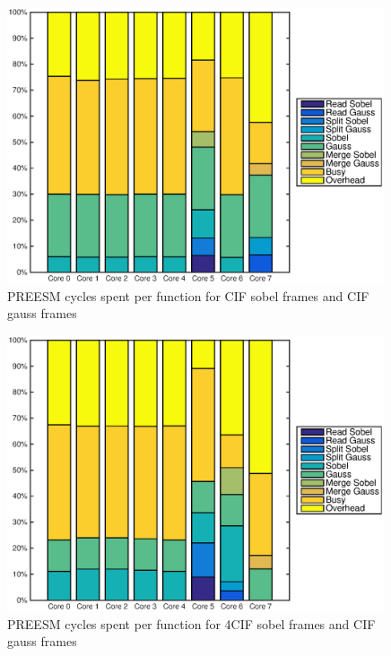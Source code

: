 \begin{figure}[h!]
    \begin{center}
        \includegraphics[width=0.99\textwidth]{images/preesm_cifcif.eps}
        \caption{PREESM cycles spent per function for CIF sobel frames and CIF gauss frames}
    \end{center}
\end{figure}

\begin{figure}[h!]
    \begin{center}
        \includegraphics[width=0.99\textwidth]{images/preesm_sobel4cif_gausscif.eps}
        \caption{PREESM cycles spent per function for 4CIF sobel frames and CIF gauss frames}
        \label{fig:preesmsobel4cif}
    \end{center}
\end{figure}

